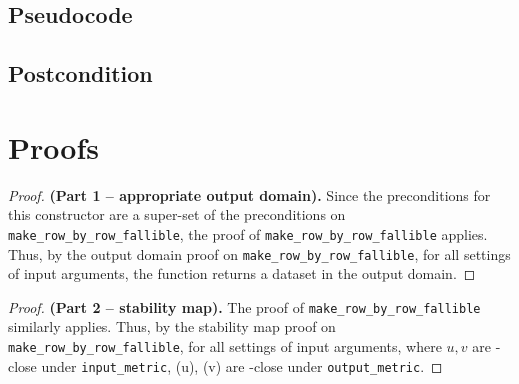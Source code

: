 \documentclass{article}
\begin{document}
\subsection*{Pseudocode}


\subsection*{Postcondition}

\section{Proofs}

\begin{proof} \textbf{(Part 1 -- appropriate output domain).}
    Since the preconditions for this constructor are a super-set of the preconditions on \texttt{make\_row\_by\_row\_fallible},
    the proof of \texttt{make\_row\_by\_row\_fallible} applies.
    Thus, by the output domain proof on \texttt{make\_row\_by\_row\_fallible},
    for all settings of input arguments, the function returns a dataset in the output domain.
\end{proof}

\begin{proof} \textbf{(Part 2 -- stability map).}
    The proof of \texttt{make\_row\_by\_row\_fallible} similarly applies.
    Thus, by the stability map proof on \texttt{make\_row\_by\_row\_fallible},
    for all settings of input arguments,
    where $u, v$ are \din-close under \texttt{input\_metric},
    \function(u), \function(v) are \dout-close under \texttt{output\_metric}.
\end{proof}
\end{document}
